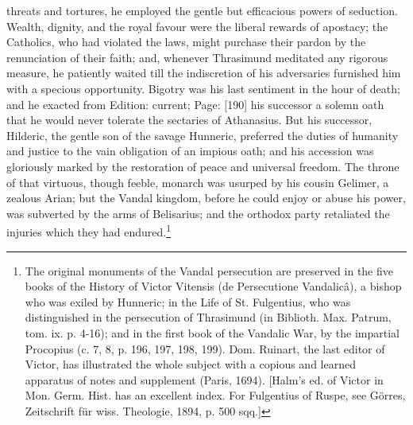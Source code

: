 threats and tortures, he employed the gentle but efficacious powers of seduction. Wealth, dignity, and the royal favour were the liberal rewards of apostacy; the Catholics, who had violated the laws, might purchase their pardon by the renunciation of their faith; and, whenever Thrasimund meditated any rigorous measure, he patiently waited till the indiscretion of his adversaries furnished him with a specious opportunity. Bigotry was his last sentiment in the hour of death; and he exacted from Edition: current; Page: [190] his successor a solemn oath that he would never tolerate the sectaries of Athanasius. But his successor, Hilderic, the gentle son of the savage Hunneric, preferred the duties of humanity and justice to the vain obligation of an impious oath; and his accession was gloriously marked by the restoration of peace and universal freedom. The throne of that virtuous, though feeble, monarch was usurped by his cousin Gelimer, a zealous Arian; but the Vandal kingdom, before he could enjoy or abuse his power, was subverted by the arms of Belisarius; and the orthodox party retaliated the injuries which they had endured.\footnote{The original monuments of the Vandal persecution are preserved in the five books of the History of Victor Vitensis (de Persecutione Vandalicâ), a bishop who was exiled by Hunneric; in the Life of St. Fulgentius, who was distinguished in the persecution of Thrasimund (in Biblioth. Max. Patrum, tom. ix. p. 4-16); and in the first book of the Vandalic War, by the impartial Procopius (c. 7, 8, p. 196, 197, 198, 199). Dom. Ruinart, the last editor of Victor, has illustrated the whole subject with a copious and learned apparatus of notes and supplement (Paris, 1694). [Halm\texthebrew{}’s ed. of Victor in Mon. Germ. Hist. has an excellent index. For Fulgentius of Ruspe, see Görres, Zeitschrift für wiss. Theologie, 1894, p. 500 sqq.]}

